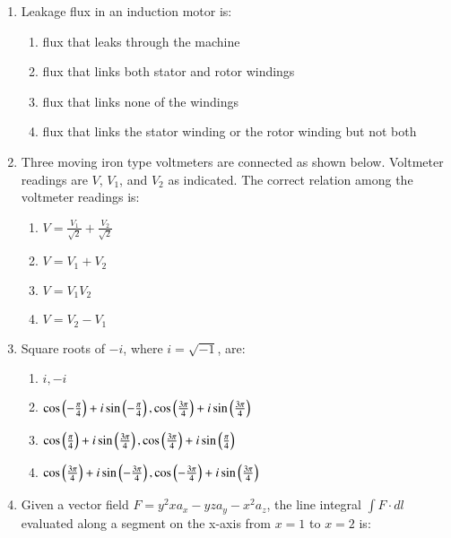 \documentclass[journal,9pt,onecolumn]{IEEEtran}
\begin{document}
\begin{enumerate}
    
\item Leakage flux in an induction motor is:
    \begin{enumerate}
        \item flux that leaks through the machine
        \item flux that links both stator and rotor windings
        \item flux that links none of the windings
        \item flux that links the stator winding or the rotor winding but not both
    \end{enumerate}


\item Three moving iron type voltmeters are connected as shown below. Voltmeter readings are $V$, $V_1$, and $V_2$ as indicated. The correct relation among the voltmeter readings is:
\begin{center}
    
\end{center}
\begin{multicols}{4}
    \begin{enumerate}
        \item $V=\frac{V_1}{\sqrt{2}}+\frac{V_2}{\sqrt{2}}$
        \item $V=V_1+V_2$
        \item $V=V_1V_2$
        \item $V=V_2-V_1$
    \end{enumerate}
\end{multicols}


\item Square roots of $-i$, where $i=\sqrt{-1}$, are:
\begin{multicols}{2}
    \begin{enumerate}
        \item $i, -i$
        \item $\cos \left(-\frac{\pi}{4} \right)+i\sin \left(-\frac{\pi}{4} \right), \cos \left(\frac{3\pi}{4} \right)+i\sin \left(\frac{3\pi}{4} \right)$
        \item $\cos \left(\frac{\pi}{4} \right)+i\sin \left(\frac{3\pi}{4} \right), \cos \left(\frac{3\pi}{4} \right)+i\sin \left(\frac{\pi}{4} \right)$
        \item $\cos \left(\frac{3\pi}{4} \right)+i\sin \left(-\frac{3\pi}{4} \right), \cos \left(-\frac{3\pi}{4} \right)+i\sin \left(\frac{3\pi}{4}\right)$
    \end{enumerate}
\end{multicols}

\item Given a vector field $F=y^2x a_x - yz a_y - x^2 a_z$, the line integral $\int F \cdot dl$ evaluated along a segment on the x-axis from $x=1$ to $x=2$ is:


\end{enumerate}
\end{document}

